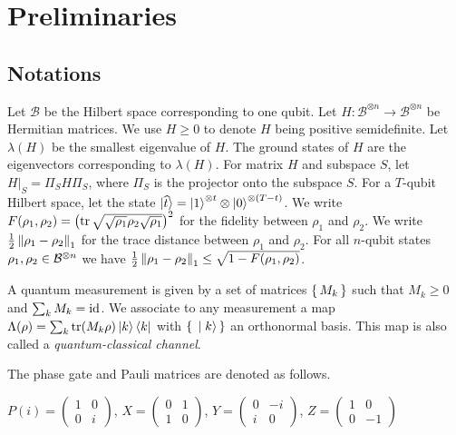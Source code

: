 \section{Preliminaries}


\subsection{Notations}

Let $\mathcal{B}$ be the Hilbert space corresponding to one qubit. Let $H:\mathcal{B}^{\otimes n}\rightarrow\mathcal{B}^{\otimes n}$ be Hermitian matrices. We use $H\geq0$ to denote $H$ being positive semidefinite. Let $\lambda(H)$ be the smallest eigenvalue of $H$. The ground states of $H$ are the eigenvectors corresponding to $\lambda(H)$. For matrix $H$ and subspace $S$, let $H\big|_S=\Pi_S H \Pi_S$, where $\Pi_S$ is the projector onto the subspace $S$. For a $T$-qubit Hilbert space, let the state $\ket{\widehat{t}}=\ket{1}^{\otimes t}\otimes \ket{0}^{{\otimes (T-t)}}$.
We write $F(\rho_1, \rho_2)=\left(\operatorname{tr}\sqrt{\sqrt{\rho_1}\rho_2\sqrt{\rho_1}}\right)^2$ for the fidelity between $\rho_1$ and $\rho_2$.
We write $\frac{1}{2}\left\lVert\rho_1-\rho_2\right\rVert_1$ for the trace distance between $\rho_1$ and $\rho_2$. For all $n$-qubit states $\rho_1, \rho_2\in\mathcal{B}^{\otimes n}$ we have $\frac{1}{2}\left\lVert\rho_1-\rho_2\right\rVert_1\leq\sqrt{1-F(\rho_1, \rho_2)}$.

\begin{definition} 
	\label{def:QCChannel}
	A quantum measurement is given by a set of matrices $\set{M_k}$ such that $M_k\geq0$ and $\sum_k M_k=\operatorname{id}$.
	We associate to any measurement a map $\Lambda(\rho)=\sum_k \operatorname{tr}(M_k\rho)\ket{k}\bra{k}$
	with $\set{\ket{k}}$ an orthonormal basis.
	This map is also called a \emph{quantum-classical channel}.
\end{definition}

The phase gate and Pauli matrices are denoted as follows.

\begin{definition}
	$P(i)=\begin{pmatrix}1&0\\0&i\end{pmatrix}$, $X=\begin{pmatrix}0&1\\1&0\end{pmatrix}$,
	$Y=\begin{pmatrix}0&-i\\i&0\end{pmatrix}$,
	$Z=\begin{pmatrix}1&0\\0&-1\end{pmatrix}$
\end{definition}

